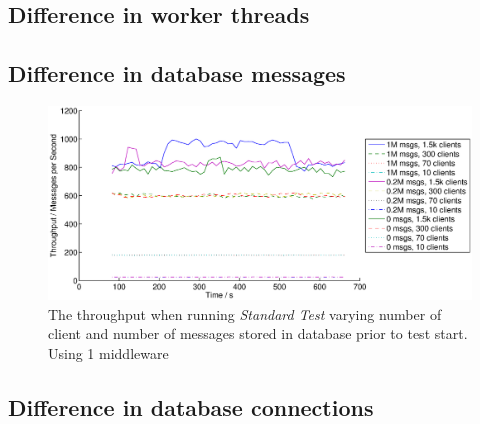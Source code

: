 \documentclass{article}
\begin{document}
        \subsection{Difference in worker threads}

        \subsection{Difference in database messages} 

            \begin{figure}[H]
                \hspace{-1.5cm}
                \includegraphics[scale=0.55]{msg_db_clients}
                \caption{The throughput when running \textit{Standard Test} varying number of client and number of messages stored in database prior to test start. Using 1 middleware}
                \label{fig:msg_db_clients}
            \end{figure}
        
        \subsection{Difference in database connections} 
            
\end{document}
